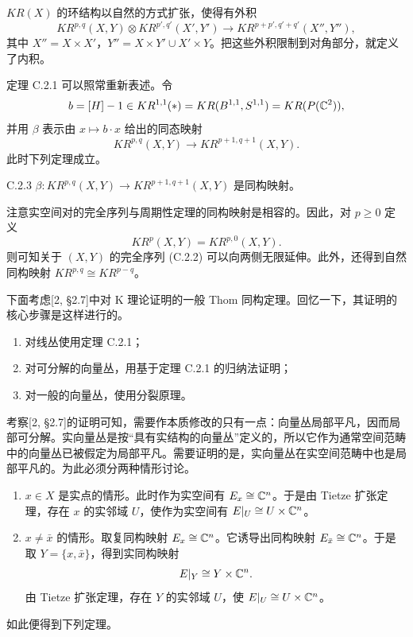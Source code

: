 $KR(X)$ 的环结构以自然的方式扩张，使得有外积
\[
KR^{p,q}(X,Y)\otimes KR^{p',q'}(X',Y')\to KR^{p+p',q'+q'}(X'',Y''),
\]
其中 $X''=X\times X'$，$Y''=X\times Y'\cup X'\times Y$。把这些外积限制到对角部分，就定义了内积。

定理 C.2.1 可以照常重新表述。令
\[
b=[H]-1\in KR^{1,1}(\ast)=KR(B^{1,1},S^{1,1})=KR(P(\mathbb{C}^2)),
\]
并用 $\beta$ 表示由 $x\mapsto b\cdot x$ 给出的同态映射
\[
KR^{p,q}(X,Y)\to KR^{p+1,q+1}(X,Y).
\]
此时下列定理成立。

\begin{theorem}{C.2.3}
  $\beta\colon KR^{p,q}(X,Y)\to KR^{p+1,q+1}(X,Y)$ 是同构映射。
\end{theorem}

注意实空间对的完全序列与周期性定理的同构映射是相容的。因此，对 $p\ge0$ 定义
\[
KR^p(X,Y)=KR^{p,0}(X,Y).
\]
则可知关于 $(X,Y)$ 的完全序列 (C.2.2) 可以向两侧无限延伸。此外，还得到自然同构映射 $KR^{p,q}\cong KR^{p-q}$。

下面考虑[2, §2.7]中对 K 理论证明的一般 Thom 同构定理。回忆一下，其证明的核心步骤是这样进行的。

\begin{enumerate}[label=(\roman*),leftmargin=2.4em,itemsep=1pt]
\item 对线丛使用定理 C.2.1；
\item 对可分解的向量丛，用基于定理 C.2.1 的归纳法证明；
\item 对一般的向量丛，使用分裂原理。
\end{enumerate}

考察[2, §2.7]的证明可知，需要作本质修改的只有一点：向量丛局部平凡，因而局部可分解。实向量丛是按“具有实结构的向量丛”定义的，所以它作为通常空间范畴中的向量丛已被假定为局部平凡。需要证明的是，实向量丛在实空间范畴中也是局部平凡的。为此必须分两种情形讨论。

\begin{enumerate}[label=(\roman*),leftmargin=2.4em,itemsep=2pt]
\item $x\in X$ 是实点的情形。此时作为实空间有 $E_x\cong\mathbb{C}^n$。于是由 Tietze 扩张定理，存在 $x$ 的实邻域 $U$，使作为实空间有 $E|_U\cong U\times\mathbb{C}^n$。
\item $x\neq\bar x$ 的情形。取复同构映射 $E_x\cong\mathbb{C}^n$。它诱导出同构映射 $E_{\bar x}\cong\mathbb{C}^n$。于是取 $Y=\{x,\bar x\}$，得到实同构映射
\[
E|_Y\cong Y\times\mathbb{C}^n.
\]
由 Tietze 扩张定理，存在 $Y$ 的实邻域 $U$，使 $E|_U\cong U\times\mathbb{C}^n$。
\end{enumerate}

如此便得到下列定理。

